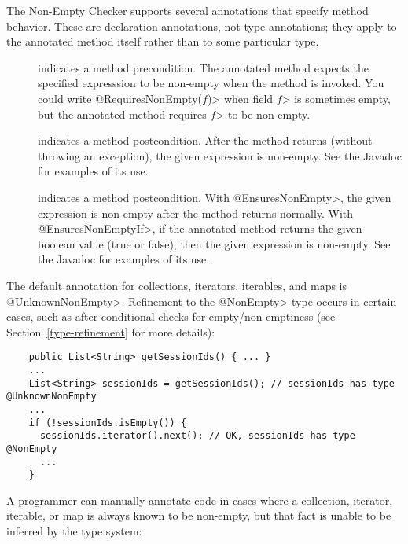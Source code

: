 The Non-Empty Checker supports several annotations that specify method
behavior.  These are declaration annotations, not type annotations;  they
apply to the annotated method itself rather than to some particular type.

\begin{description}

\item[]
  indicates a method precondition.  The annotated method expects the
  specified expresssion to be non-empty when the
  method is invoked.  You could write \<@RequiresNonEmpty($f$)> when field
  \<$f$> is sometimes empty, but the annotated method requires
  \<$f$> to be non-empty.

\item[]
  indicates a method postcondition.  After the method returns (without
  throwing an exception), the given
  expression is non-empty. See the Javadoc for examples of its use.

\item[]
  indicates a method postcondition.  With \<@EnsuresNonEmpty>, the given
  expression is non-empty after the method returns normally.  With
  \<@EnsuresNonEmptyIf>, if the annotated
  method returns the given boolean value (true or false), then the given
  expression is non-empty. See the Javadoc for examples of its use.

\end{description}



The default annotation for collections, iterators, iterables, and maps is
\<@UnknownNonEmpty>.
Refinement to the \<@NonEmpty> type occurs in certain cases, such as after
conditional checks for empty/non-emptiness (see Section~\ref{type-refinement} for
more details):

\begin{Verbatim}
    public List<String> getSessionIds() { ... }
    ...
    List<String> sessionIds = getSessionIds(); // sessionIds has type @UnknownNonEmpty
    ...
    if (!sessionIds.isEmpty()) {
      sessionIds.iterator().next(); // OK, sessionIds has type @NonEmpty
      ...
    }
\end{Verbatim}

A programmer can manually annotate code in cases where a collection,
iterator, iterable, or map is always known to be non-empty, but that fact is
unable to be inferred by the type system:

